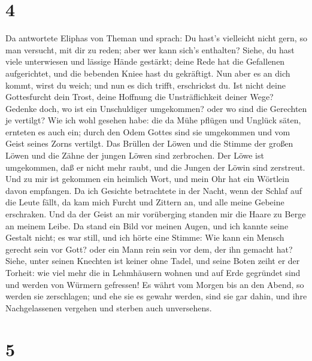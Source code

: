\hypertarget{section-3}{%
\section{4}\label{section-3}}

 Da antwortete Eliphas von Theman und sprach: 
Du hast's vielleicht nicht gern, so man versucht, mit dir zu reden; aber
wer kann sich's enthalten?  Siehe, du hast viele unterwiesen
und lässige Hände gestärkt;  deine Rede hat die Gefallenen
aufgerichtet, und die bebenden Kniee hast du gekräftigt. 
Nun aber es an dich kommt, wirst du weich; und nun es dich trifft,
erschrickst du.  Ist nicht deine Gottesfurcht dein Trost,
deine Hoffnung die Unsträflichkeit deiner Wege?  Gedenke
doch, wo ist ein Unschuldiger umgekommen? oder wo sind die Gerechten je
vertilgt?  Wie ich wohl gesehen habe: die da Mühe pflügen
und Unglück säten, ernteten es auch ein;  durch den Odem
Gottes sind sie umgekommen und vom Geist seines Zorns vertilgt.
 Das Brüllen der Löwen und die Stimme der großen Löwen und
die Zähne der jungen Löwen sind zerbrochen.  Der Löwe ist
umgekommen, daß er nicht mehr raubt, und die Jungen der Löwin sind
zerstreut.  Und zu mir ist gekommen ein heimlich Wort, und
mein Ohr hat ein Wörtlein davon empfangen.  Da ich Gesichte
betrachtete in der Nacht, wenn der Schlaf auf die Leute fällt,
 da kam mich Furcht und Zittern an, und alle meine Gebeine
erschraken.  Und da der Geist an mir vorüberging standen
mir die Haare zu Berge an meinem Leibe.  Da stand ein Bild
vor meinen Augen, und ich kannte seine Gestalt nicht; es war still, und
ich hörte eine Stimme:  Wie kann ein Mensch gerecht sein
vor Gott? oder ein Mann rein sein vor dem, der ihn gemacht hat?
 Siehe, unter seinen Knechten ist keiner ohne Tadel, und
seine Boten zeiht er der Torheit:  wie viel mehr die in
Lehmhäusern wohnen und auf Erde gegründet sind und werden von Würmern
gefressen!  Es währt vom Morgen bis an den Abend, so werden
sie zerschlagen; und ehe sie es gewahr werden, sind sie gar dahin,
 und ihre Nachgelassenen vergehen und sterben auch
unversehens.

\hypertarget{section-4}{%
\section{5}\label{section-4}}

